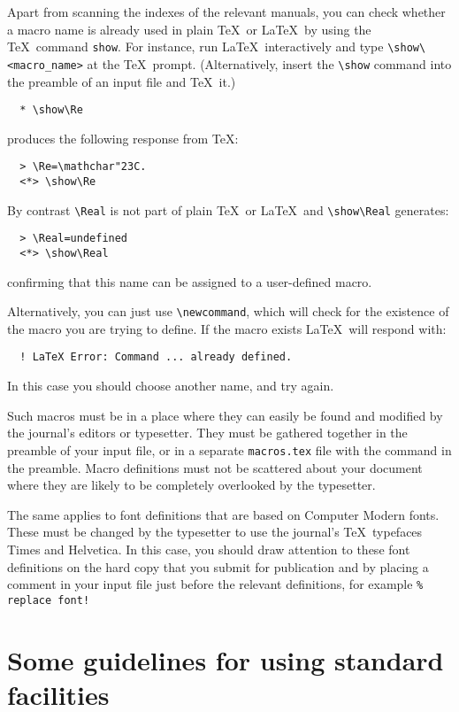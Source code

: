 \documentclass{jfm}
\newcommand\Real{\mbox{Re}} %
\begin{document}
Apart from scanning the indexes of the relevant manuals, you can check
whether a macro name is already used in plain \TeX\ or \LaTeX\ by using
the \TeX\ command \verb"show". For instance, run \LaTeX\ interactively
and type \verb"\show\<macro_name>" at the \TeX\ prompt. (Alternatively,
insert the \verb"\show" command into the preamble of an input file and
\TeX\ it.)
%
\begin{verbatim}
  * \show\Re
\end{verbatim}
%
produces the following response from \TeX :
%
\begin{verbatim}
  > \Re=\mathchar"23C.
  <*> \show\Re
\end{verbatim}
%
By contrast \verb"\Real" is not part of plain \TeX\ or \LaTeX\ and
\verb"\show\Real" generates:
%
\begin{verbatim}
  > \Real=undefined
  <*> \show\Real
\end{verbatim}
%
confirming that this name can be assigned to a user-defined macro.

Alternatively, you can just use \verb"\newcommand", which will check for
the existence of the macro you are trying to define.  If the macro exists
\LaTeX\ will respond with:
%
\begin{verbatim}
  ! LaTeX Error: Command ... already defined.
\end{verbatim}
%
In this case you should choose another name, and try again.

Such macros must be in a place where they can easily be found and
modified by the journal's editors or typesetter. They must be gathered
together in the preamble of your input file, or in a separate
\verb"macros.tex" file with the command \verb"" in the
preamble. Macro definitions must not be scattered about your document
where they are likely to be completely overlooked by the typesetter.

The same applies to font definitions that are based on Computer Modern
fonts. These must be changed by the typesetter to use the journal's
\TeX\ typefaces Times and Helvetica. In this case, you should draw
attention to these font definitions on the hard copy that you submit for
publication and by placing a comment in your input file just before the
relevant definitions, for example \verb"% replace font!"

\section{Some guidelines for using standard facilities}
\end{document}
